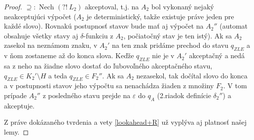 \begin{proof}
$\supseteq :$ Nech $(?!~L_2)$ akceptoval, t.j. na $A_2$ bol vykonaný nejaký neakceptujúci výpočet ($A_2$ je deterministický, takže existuje práve jeden pre každé slovo). Rovnakú postupnosť stavov bude mať aj výpočet na $A_2''$ (automat obsahuje všetky stavy aj $\delta$-funkciu z $A_2$, počiatočný stav je ten istý). Ak sa $A_2$ zasekol na neznámom znaku, v $A_2'$ na ten znak pridáme prechod do stavu $q_{ZLE}$ a v ňom zostaneme až do konca slova. Keďže $q_{ZLE}$ nie je v $A_2'$ akceptačný a nedá sa z neho na žiadne slovo dostať do ľubovoľného akceptačného stavu, $q_{ZLE} \in K_2' \setminus H$ a teda $q_{ZLE} \in F_2''$. Ak sa $A_2$ nezasekol, tak dočítal slovo do konca a v postupnosti stavov jeho výpočtu sa nenachádza žiaden z množiny $F_2$. V tom prípade $A_2''$ z posledného stavu prejde na $\varepsilon$ do $q_A$ (2.riadok definície $\delta_2''$) a akceptuje.

Z práve dokázaného tvrdenia a vety \ref{lookahead+R} už vyplýva aj platnosť našej lemy.
\end{proof}

